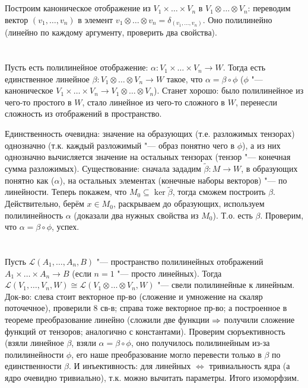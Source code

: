 \section{} %
Построим каноническое отображение из $V_1 \times \dots \times V_n$ в $V_1 \otimes \dots \otimes V_n$:
переводим вектор $(v_1, \dots, v_n)$ в элемент $v_1\otimes\dots\otimes v_n=\delta_{(v_1, \dots, v_n)}$.
Оно полилинейно (линейно по каждому аргументу, проверить два свойства).

\section{} %
Пусть есть полилинейное отображение: $\alpha \colon V_1 \times \dots \times V_n \to W$.
Тогда есть единственное линейное $\beta \colon V_1 \otimes \dots \otimes V_n \to W$ такое,
что $\alpha = \beta \circ \phi$ ($\phi$ "--- каноническое $V_1 \times \dots \times V_n \to  V_1 \otimes \dots \otimes V_n$).
Станет хорошо: было полилинейное из чего-то простого в $W$, стало линейное из чего-то сложного в $W$,
перенесли сложность из отображений в пространство.

Единственность очевидна: значение на образующих (т.е. разложимых тензорах) однозначно (т.к. каждый
разложимый "--- образ понятно чего в $\phi$), а из них однозначно вычисляется значение на остальных
тензорах (тензор "--- конечная сумма разложимых).
Существование: сначала зададим $\tilde\beta \colon M \to W$, в образующих понятно как ($\alpha$),
на остальных элементах (конечные наборы векторов) "--- по линейности.
Теперь покажем, что $M_0 \subseteq \ker \tilde\beta$, тогда сможем построить $\beta$.
Действительно, берём $x \in M_0$, раскрываем до образующих, используем полилинейность
$\alpha$ (доказали два нужных свойства из $M_0$).
Т.о. есть $\beta$.
Проверим, что $\alpha = \beta \circ \phi$, успех.

\section{} %
Пусть $\mathcal L(A_1, \dots, A_n, B)$ "--- пространство полилинейных отображений $A_1 \times \dots \times A_n \to B$
(если $n=1$ "--- просто линейных).
Тогда $\mathcal L(V_1, \dots, V_n, W) \cong \mathcal L (V_1 \otimes \dots \otimes V_n, W)$ "--- свели полилинейные к линейным.
Док-во: слева стоит векторное пр-во (сложение и умножение на скаляр поточечное), проверили 8 св-в;
справа тоже векторное пр-во; а построенное в теореме преобразование линейно (сложили две функции $\Rightarrow$
получили сложение функций от тензоров; аналогично с константами).
Проверим сюръективность (взяли линейное $\beta$, взяли $\alpha=\beta \circ \phi$, оно получилось
полилинейным из-за полилинейности $\phi$, его наше преобразование могло перевести только в $\beta$ по единственности
$\beta$.
И инъективность: для линейных $\iff$ тривиальность ядра (а ядро очевидно тривиально),
т.к. можно вычитать параметры.
Итого изоморфзим.

